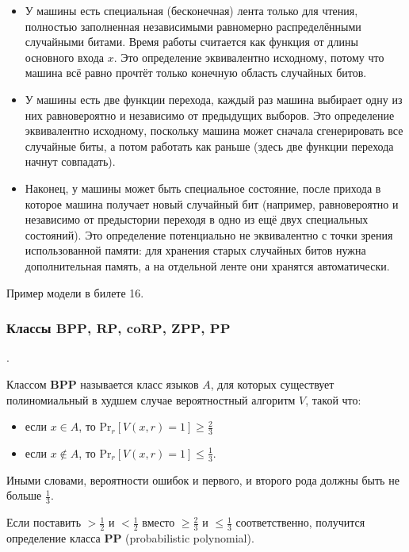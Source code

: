 \begin{itemize}
\item У машины есть специальная (бесконечная) лента только для чтения, полностью заполненная независимыми равномерно распределёнными случайными битами. Время работы считается как функция от длины основного
входа $x$. Это определение эквивалентно исходному, потому что машина
всё равно прочтёт только конечную область случайных битов.
\item У машины есть две функции перехода, каждый раз машина выбирает
одну из них равновероятно и независимо от предыдущих выборов. Это
определение эквивалентно исходному, поскольку машина может сначала
сгенерировать все случайные биты, а потом работать как раньше (здесь
две функции перехода начнут совпадать).
\item Наконец, у машины может быть специальное состояние, после прихода
в которое машина получает новый случайный бит (например, равновероятно и независимо от предыстории переходя в одно из ещё двух специальных состояний). Это определение потенциально не эквивалентно с
точки зрения использованной памяти: для хранения старых случайных
битов нужна дополнительная память, а на отдельной ленте они хранятся
автоматически.
\end{itemize}

Пример модели в билете 16.

\subsubsection{Классы $\mathbf{BPP}$, $\mathbf{RP}$, $\mathbf{coRP}$, $\mathbf{ZPP}$, $\mathbf{PP}$}.

\begin{definition}
    Классом \textbf{BPP} называется класс языков $A$, для которых существует полиномиальный в худшем случае вероятностный алгоритм $V$, такой что:

    \begin{itemize}
    \item  если $x \in A$, то Pr$_r [V(x, r) = 1] \geq \frac{2}{3}$
    \item  если $x \not \in A$, то Pr$_r [V(x, r) = 1] \leq \frac{1}{3}$.
    \end{itemize}

Иными словами, вероятности ошибок и первого, и второго рода должны
быть не больше $\frac{1}{3}$.

Если поставить $> \frac{1}{2}$ и $< \frac{1}{2}$ вместо $\geq \frac{2}{3}$ и $\leq \frac{1}{3}$
соответственно, получится определение
класса \textbf{PP} (probabilistic polynomial).
\end{definition}

